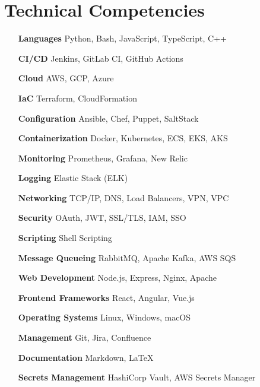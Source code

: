 \section{Technical Competencies}

\begin{multicols}{2}
    \begin{itemize}[itemsep=-2px, parsep=1pt, leftmargin=75pt]
        \item[\textbf{Languages}] Python, Bash, JavaScript, TypeScript, C++
        \item[\textbf{CI/CD}] Jenkins, GitLab CI, GitHub Actions
        \item[\textbf{Cloud}] AWS, GCP, Azure
        \item[\textbf{IaC}] Terraform, CloudFormation
        \item[\textbf{Configuration}] Ansible, Chef, Puppet, SaltStack
        \item[\textbf{Containerization}] Docker, Kubernetes, ECS, EKS, AKS
        \item[\textbf{Monitoring}] Prometheus, Grafana, New Relic
        \item[\textbf{Logging}] Elastic Stack (ELK)
        \item[\textbf{Networking}] TCP/IP, DNS, Load Balancers, VPN, VPC
        \item[\textbf{Security}] OAuth, JWT, SSL/TLS, IAM, SSO
        \item[\textbf{Scripting}] Shell Scripting
        \item[\textbf{Message Queueing}] RabbitMQ, Apache Kafka, AWS SQS
        \item[\textbf{Web Development}] Node.js, Express, Nginx, Apache
        \item[\textbf{Frontend Frameworks}] React, Angular, Vue.js
        \item[\textbf{Operating Systems}] Linux, Windows, macOS
        \item[\textbf{Management}] Git, Jira, Confluence
        \item[\textbf{Documentation}] Markdown, LaTeX
        \item[\textbf{Secrets Management}] HashiCorp Vault, AWS Secrets Manager
    \end{itemize}
\end{multicols}
